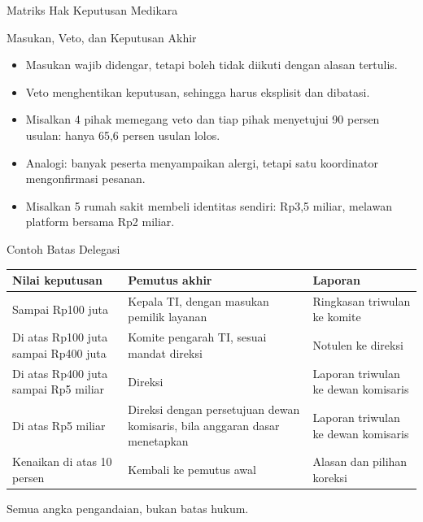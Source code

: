 \documentclass[aspectratio=169, table, 12pt]{beamer}
\begin{document}
\begin{frame}{{\Large Matriks Hak Keputusan Medikara}}
  \centering
  \resizebox{!}{0.7\textheight}{}
\end{frame}

\begin{frame}{{\Large Masukan, Veto, dan Keputusan Akhir}}
  \vspace{4pt}
  \small
  \begin{itemize}
    \item Masukan wajib didengar, tetapi boleh tidak diikuti dengan alasan tertulis.
    \item Veto menghentikan keputusan, sehingga harus eksplisit dan dibatasi.
    \item Misalkan 4 pihak memegang veto dan tiap pihak menyetujui 90 persen usulan: hanya 65,6 persen
          usulan lolos.
    \item Analogi: banyak peserta menyampaikan alergi, tetapi satu koordinator mengonfirmasi pesanan.
    \item Misalkan 5 rumah sakit membeli identitas sendiri: Rp3,5 miliar, melawan platform bersama Rp2
          miliar.
  \end{itemize}
\end{frame}

\begin{frame}{{\Large Contoh Batas Delegasi}}
  \vspace{4pt}
  \footnotesize
  \begin{tabularx}{\textwidth}{|>{\raggedright\arraybackslash}p{}|>{\raggedright\arraybackslash}X|>{\raggedright\arraybackslash}p{}|}
    \hline
    \textbf{Nilai keputusan} & \textbf{Pemutus akhir} & \textbf{Laporan} \\ \hline
    Sampai Rp100 juta & Kepala TI, dengan masukan pemilik layanan & Ringkasan triwulan ke komite \\ \hline
    Di atas Rp100 juta sampai Rp400 juta & Komite pengarah TI, sesuai mandat direksi & Notulen ke direksi
    \\ \hline
    Di atas Rp400 juta sampai Rp5 miliar & Direksi & Laporan triwulan ke dewan komisaris \\ \hline
    Di atas Rp5 miliar & Direksi dengan persetujuan dewan komisaris, bila anggaran dasar menetapkan &
    Laporan triwulan ke dewan komisaris \\ \hline
    Kenaikan di atas 10 persen & Kembali ke pemutus awal & Alasan dan pilihan koreksi \\ \hline
  \end{tabularx}

  \vspace{4pt}
  \small Semua angka pengandaian, bukan batas hukum.
\end{frame}
\end{document}
